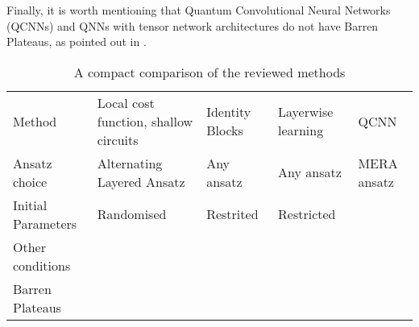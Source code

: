 Finally, it is worth mentioning that Quantum Convolutional Neural Networks (QCNNs) and QNNs with tensor network architectures do not have Barren Plateaus, as pointed out in \cite{congQuantumConvolutionalNeural2019}.

\begin{table}[]
    \centering
    \begin{tabular}{l|p{2cm}|p{2cm}|p{2cm}|p{2cm}}
        Method              & Local cost function, shallow circuits & Identity Blocks   & Layerwise learning    & QCNN \\
        Ansatz choice       & Alternating Layered Ansatz            & Any ansatz        & Any ansatz            & MERA ansatz\\
        Initial Parameters  & Randomised                            & Restrited         & Restricted            &  \\
        Other conditions    & \\
        Barren Plateaus     & \\
    \end{tabular}
    \caption{A compact comparison of the reviewed methods}
    \label{tab:my_label}
\end{table}